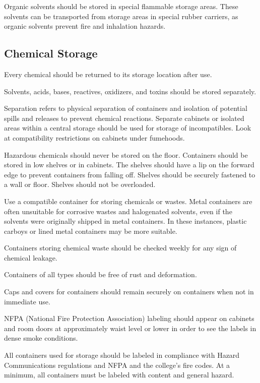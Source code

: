 \documentclass[12pt]{../SOP4_alpha}\usepackage[]{graphicx}\usepackage[]{color}
\begin{document}
\NP Organic solvents should be stored in special flammable storage areas. These solvents can be transported from storage areas in special rubber carriers, as organic solvents prevent fire and inhalation hazards. 

\subsection*{Chemical Storage}

\NP Every chemical should be returned to its storage location after use. 

\NP Solvents, acids, bases, reactives, oxidizers, and toxins should be stored separately.

\NP Separation refers to physical separation of containers and isolation of potential spills and releases to prevent chemical reactions. Separate cabinets or isolated areas within a central storage should be used for storage of incompatibles. Look at compatibility restrictions on cabinets under fumehoods. 

\NP Hazardous chemicals should never be stored on the floor. Containers should be stored in low shelves or in cabinets. The shelves should have a lip on the forward edge to prevent containers from falling off. Shelves should be securely fastened to a wall or floor. Shelves should not be overloaded.

\NP Use a compatible container for storing chemicals or wastes. Metal containers are often unsuitable for corrosive wastes and halogenated solvents, even if the solvents were originally shipped in metal containers. In these instances, plastic carboys or lined metal containers may be more suitable. 

\NP Containers storing chemical waste should be checked weekly for any sign of chemical leakage.

\NP Containers of all types should be free of rust and deformation. 

\NP Caps and covers for containers should remain securely on containers when not in immediate use.

\NP NFPA (National Fire Protection Association) labeling should appear on cabinets and room doors at approximately waist level or lower in order to see the labels in dense smoke conditions.

\NP All containers used for storage should be labeled in compliance with Hazard Communications regulations and NFPA and the college's fire codes. At a minimum, all containers must be labeled with content and general hazard.
\end{document}
